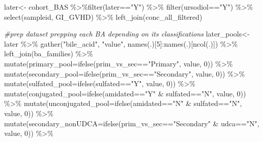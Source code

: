 \documentclass[
]{book}
\newenvironment{Shaded}{\begin{snugshade}}{\end{snugshade}}
\newcommand{\AttributeTok}[1]{\textcolor[rgb]{0.77,0.63,0.00}{#1}}
\newcommand{\CommentTok}[1]{\textcolor[rgb]{0.56,0.35,0.01}{\textit{#1}}}
\newcommand{\DecValTok}[1]{\textcolor[rgb]{0.00,0.00,0.81}{#1}}
\newcommand{\FunctionTok}[1]{\textcolor[rgb]{0.00,0.00,0.00}{#1}}
\newcommand{\NormalTok}[1]{#1}
\newcommand{\OtherTok}[1]{\textcolor[rgb]{0.56,0.35,0.01}{#1}}
\newcommand{\SpecialCharTok}[1]{\textcolor[rgb]{0.00,0.00,0.00}{#1}}
\newcommand{\StringTok}[1]{\textcolor[rgb]{0.31,0.60,0.02}{#1}}
\begin{document}
\begin{Shaded}
\begin{Highlighting}[]
\NormalTok{later}\OtherTok{\textless{}{-}}\NormalTok{ cohort\_BAS }\SpecialCharTok{\%\textgreater{}\%}\FunctionTok{filter}\NormalTok{(later}\SpecialCharTok{==}\StringTok{"Y"}\NormalTok{) }\SpecialCharTok{\%\textgreater{}\%} 
  \FunctionTok{filter}\NormalTok{(ursodiol}\SpecialCharTok{==}\StringTok{"Y"}\NormalTok{) }\SpecialCharTok{\%\textgreater{}\%} 
  \FunctionTok{select}\NormalTok{(sampleid, GI\_GVHD) }\SpecialCharTok{\%\textgreater{}\%} 
  \FunctionTok{left\_join}\NormalTok{(conc\_all\_filtered)}

\CommentTok{\#prep dataset prepping each BA depending on its classifications}
\NormalTok{later\_pools}\OtherTok{\textless{}{-}}\NormalTok{later }\SpecialCharTok{\%\textgreater{}\%} 
  \FunctionTok{gather}\NormalTok{(}\StringTok{"bile\_acid"}\NormalTok{, }\StringTok{"value"}\NormalTok{, }\FunctionTok{names}\NormalTok{(.)[}\DecValTok{5}\NormalTok{]}\SpecialCharTok{:}\FunctionTok{names}\NormalTok{(.)[}\FunctionTok{ncol}\NormalTok{(.)]) }\SpecialCharTok{\%\textgreater{}\%} 
  \FunctionTok{left\_join}\NormalTok{(ba\_families) }\SpecialCharTok{\%\textgreater{}\%} 
  \FunctionTok{mutate}\NormalTok{(}\AttributeTok{primary\_pool=}\FunctionTok{ifelse}\NormalTok{(prim\_vs\_sec}\SpecialCharTok{==}\StringTok{"Primary"}\NormalTok{, value, }\DecValTok{0}\NormalTok{)) }\SpecialCharTok{\%\textgreater{}\%} 
  \FunctionTok{mutate}\NormalTok{(}\AttributeTok{secondary\_pool=}\FunctionTok{ifelse}\NormalTok{(prim\_vs\_sec}\SpecialCharTok{==}\StringTok{"Secondary"}\NormalTok{, value, }\DecValTok{0}\NormalTok{)) }\SpecialCharTok{\%\textgreater{}\%} 
  \FunctionTok{mutate}\NormalTok{(}\AttributeTok{sulfated\_pool=}\FunctionTok{ifelse}\NormalTok{(sulfated}\SpecialCharTok{==}\StringTok{"Y"}\NormalTok{, value, }\DecValTok{0}\NormalTok{)) }\SpecialCharTok{\%\textgreater{}\%} 
  \FunctionTok{mutate}\NormalTok{(}\AttributeTok{conjugated\_pool=}\FunctionTok{ifelse}\NormalTok{(amidated}\SpecialCharTok{==}\StringTok{"Y"} \SpecialCharTok{\&}\NormalTok{ sulfated}\SpecialCharTok{==}\StringTok{"N"}\NormalTok{, value, }\DecValTok{0}\NormalTok{)) }\SpecialCharTok{\%\textgreater{}\%} 
  \FunctionTok{mutate}\NormalTok{(}\AttributeTok{unconjugated\_pool=}\FunctionTok{ifelse}\NormalTok{(amidated}\SpecialCharTok{==}\StringTok{"N"} \SpecialCharTok{\&}\NormalTok{ sulfated}\SpecialCharTok{==}\StringTok{"N"}\NormalTok{, value, }\DecValTok{0}\NormalTok{)) }\SpecialCharTok{\%\textgreater{}\%} 
  \FunctionTok{mutate}\NormalTok{(}\AttributeTok{secondary\_nonUDCA=}\FunctionTok{ifelse}\NormalTok{(prim\_vs\_sec}\SpecialCharTok{==}\StringTok{"Secondary"} \SpecialCharTok{\&}\NormalTok{ udca}\SpecialCharTok{==}\StringTok{"N"}\NormalTok{, value, }\DecValTok{0}\NormalTok{)) }\SpecialCharTok{\%\textgreater{}\%} 

\end{Highlighting}
\end{Shaded}
\end{document}
